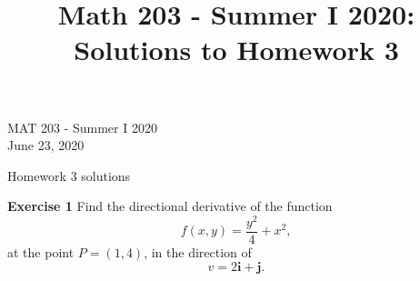\documentclass[12pt,oneside]{exam}
\title{Math 203 - Summer I 2020: Solutions to Homework 3}
\newenvironment{exercise}[1]{\vspace{.1in}\noindent\textbf{Exercise #1 \hspace{.05em}}}{}
\begin{document}
\begin{flushright}
\sc MAT 203 - Summer I 2020\\
June 23, 2020
\end{flushright}
\bigskip
 
\begin{center}
\textsf{Homework 3 solutions} 
\end{center}


\begin{exercise}{1}
Find the directional derivative of the function
\begin{equation*}
f(x,y)= \frac{y^2}{4} + x^2,
\end{equation*}
at the point $P=(1,4)$, in the direction of
\begin{equation*}
v = 2\mathbf{i} + \mathbf{j}.
\end{equation*}
\end{exercise}
\end{document}
